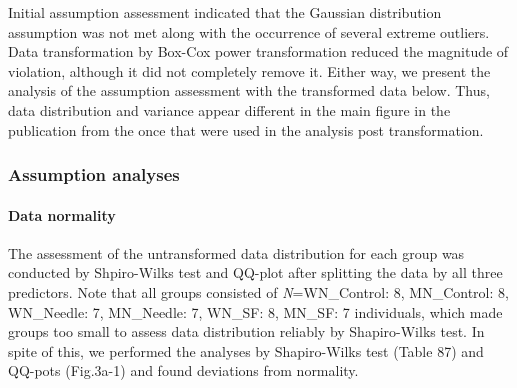 \documentclass[
  12pt,
  letterpaper,
]{article}
\begin{document}
Initial assumption assessment indicated that the Gaussian distribution assumption was not met along with the occurrence of several extreme outliers. Data transformation by Box-Cox power transformation reduced the magnitude of violation, although it did not completely remove it. Either way, we present the analysis of the assumption assessment with the transformed data below. Thus, data distribution and variance appear different in the main figure in the publication from the once that were used in the analysis post transformation.

\subsubsection{Assumption analyses}\label{assumption-analyses-2}

\paragraph{Data normality}\label{data-normality-2}

The assessment of the untransformed data distribution for each group was conducted by Shpiro-Wilks test and QQ-plot after splitting the data by all three predictors. Note that all groups consisted of \emph{N}=WN\_Control: 8, MN\_Control: 8, WN\_Needle: 7, MN\_Needle: 7, WN\_SF: 8, MN\_SF: 7 individuals, which made groups too small to assess data distribution reliably by Shapiro-Wilks test. In spite of this, we performed the analyses by Shapiro-Wilks test (Table 87) and QQ-pots (Fig.3a-1) and found deviations from normality.
\end{document}
